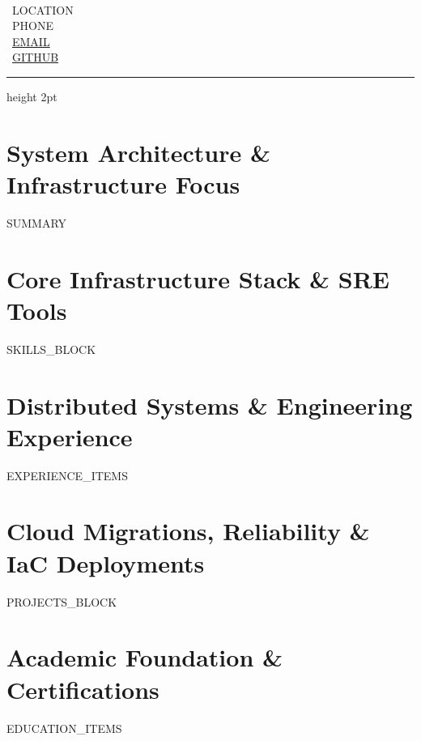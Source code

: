 \documentclass[10pt,letterpaper]{article}
\begin{document}
\begin{minipage}[t]{0.65\textwidth}
  {\Huge \textbf{}} \\[3pt]
  {\normalsize \textbf{}}
\end{minipage}
\hfill
\begin{minipage}[t]{0.33\textwidth}
  \raggedleft \small
  \faMapMarker* \ {{LOCATION}} \\
  \faPhone \ {{PHONE}} \\
  \faEnvelope \ \href{mailto:{{EMAIL}}}{{{EMAIL}}} \\
  \faGithub \ \href{https://{{GITHUB}}}{{{GITHUB}}}
\end{minipage}

\vspace{6pt}
{\color{srecyan}\hrule height 2pt}
\vspace{6pt}

\section{System Architecture \& Infrastructure Focus}
\small
{{SUMMARY}}

\section{Core Infrastructure Stack \& SRE Tools}
\small
{{SKILLS_BLOCK}}

\section{Distributed Systems \& Engineering Experience}
\small
{{EXPERIENCE_ITEMS}}

\section{Cloud Migrations, Reliability \& IaC Deployments}
\small
{{PROJECTS_BLOCK}}

\section{Academic Foundation \& Certifications}
\small
{{EDUCATION_ITEMS}}
\end{document}
